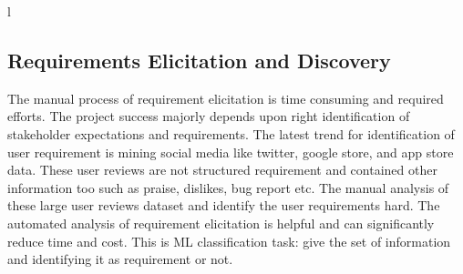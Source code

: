 l\subsection{Requirements Elicitation and Discovery} The manual process of
requirement elicitation is time consuming and required efforts. The project
success majorly depends upon right identification of stakeholder expectations
and requirements. The latest trend for identification of user requirement is
mining social media like twitter, google store, and app store data. These user
reviews are not structured requirement and contained other information too such
as praise, dislikes, bug report etc. The manual analysis of these large user
reviews dataset and identify the user requirements hard. The automated analysis
of requirement elicitation is helpful and can significantly reduce time and
cost. This is ML classification task: give the set of information and
identifying it as requirement or not.\\

